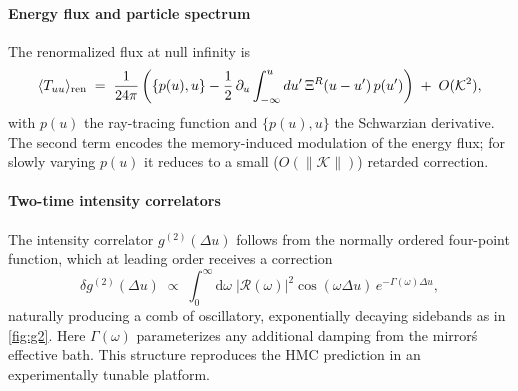\documentclass[a4paper,11pt]{article}
\newcommand{\HMC}{\textup{\textsc{HMC}}\xspace}
\theoremstyle{plain}
\theoremstyle{definition}
\theoremstyle{remark}
\begin{document}
\paragraph{Energy flux and particle spectrum}
The renormalized flux at null infinity is
\begin{equation}
\langle T_{uu}\rangle_{\rm ren}\;=\;\frac{1}{24\pi}\left(\{p(u),u\}-\frac{1}{2}\,\partial_u \int_{-\infty}^u du'\,\Xi^R(u-u')\,p(u')\right)\;+\;O(\mathcal{K}^2),
\end{equation}
with $p(u)$ the ray-tracing function and $\{p(u),u\}$ the Schwarzian derivative. The second term encodes the memory-induced modulation of the energy flux; for slowly varying $p(u)$ it reduces to a small ($O(\|\mathcal{K}\|)$) retarded correction.

\paragraph{Two-time intensity correlators}
The intensity correlator $g^{(2)}(\Delta u)$ follows from the normally ordered four-point function, which at leading order receives a correction
\begin{equation}
\delta g^{(2)}(\Delta u)\;\propto\; \int_{0}^{\infty} \mathrm{d}\omega\;\left|\mathcal{R}(\omega)\right|^2\cos(\omega\Delta u)\,e^{-\Gamma(\omega)\Delta u},
\end{equation}
naturally producing a comb of oscillatory, exponentially decaying sidebands as in \cref{fig:g2}. Here $\Gamma(\omega)$ parameterizes any additional damping from the mirror\'s effective bath. This structure reproduces the \HMC{} prediction in an experimentally tunable platform.
\end{document}
